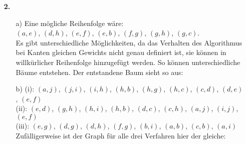 \documentclass [a4paper,11pt]{article}
\begin{document}
\begin{enumerate}
\begin{enumerate}
\end{enumerate}

    \item[\textbf{2.}]
        \begin{enumerate}
        \item[a)]
            Eine mögliche Reihenfolge wäre:\\
            $(a,e)$, $(d,h)$, $(e,f)$, $(e,b)$, $(f,g)$, $(g,h)$, $(g,c)$.\\
            Es gibt unterschiedliche Möglichkeiten, da das Verhalten des Algorithmus bei Kanten gleichen Gewichts nicht genau
            definiert ist, sie können in willkürlicher Reihenfolge hinzugefügt werden. So können unterschiedliche Bäume entstehen.
            Der entstandene Baum sieht so aus:\\
            \begin{figure}[h]
                \centering
            \end{figure}

    \item[b)]
        (i): $(a,j)$, $(j,i)$, $(i,h)$, $(h,b)$, $(h,g)$, $(h,c)$, $(c,d)$, $(d,e)$, $(e,f)$\\
        (ii): $(e,d)$, $(g,h)$, $(h,i)$, $(h,b)$, $(d,c)$, $(c,h)$, $(a,j)$, $(i,j)$, $(e,f)$\\
        (iii): $(e,g)$, $(d,g)$, $(d,h)$, $(f,g)$, $(b,i)$, $(a,b)$, $(c,b)$, $(a,i)$\\
        Zufälligerweise ist der Graph für alle drei Verfahren hier der gleiche:\\


\end{enumerate}
\end{enumerate}
\end{document}
